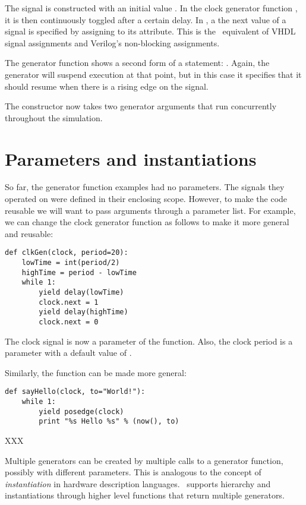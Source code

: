 The  signal is constructed with an initial value
. In the clock generator function , it is then
continuously toggled after a certain delay. In \myhdl{}, a the next
value of a signal is specified by assigning to its 
attribute. This is the \myhdl\ equivalent of VHDL signal assignments
and Verilog's non-blocking assignments.

The  generator function shows a second form of a
 statement: . Again,
the generator will suspend execution at that point, but in this case
it specifies that it should resume when there is a rising edge on the
signal.

The  constructor now takes two generator arguments
that run concurrently throughout the simulation.

\section{Parameters and instantiations}

So far, the generator function examples had no parameters. The signals
they operated on were defined in their enclosing scope. However, 
to make the code reusable we will want to pass arguments through a
parameter list. For example, we can change the clock generator
function as follows to make it more general and reusable:

\begin{verbatim}
def clkGen(clock, period=20):
    lowTime = int(period/2)
    highTime = period - lowTime
    while 1:
        yield delay(lowTime)
        clock.next = 1
        yield delay(highTime)
        clock.next = 0

\end{verbatim}

The clock signal is now a parameter of the function. Also, the clock
period is a parameter with a default value of .

Similarly, the  function can be made more general:

\begin{verbatim}
def sayHello(clock, to="World!"):
    while 1:
        yield posedge(clock)
        print "%s Hello %s" % (now(), to)

\end{verbatim}

XXX

Multiple generators can be created by multiple calls to a generator
function, possibly with different parameters. This is analogous to the
concept of \emph{instantiation} in hardware description
languages. \myhdl\ supports hierarchy and instantiations through
higher level functions that return multiple generators.

